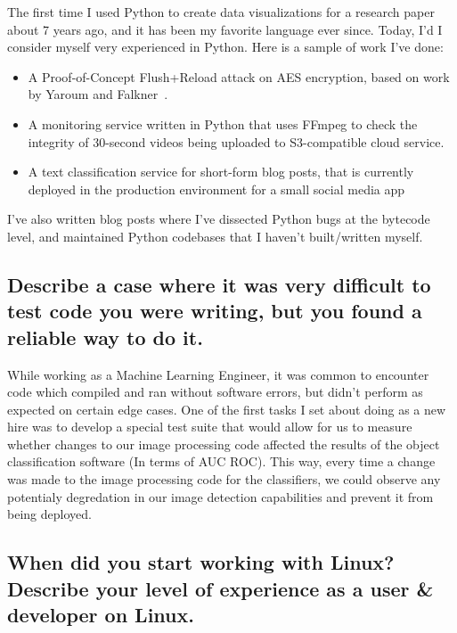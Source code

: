 \documentclass{article}
\begin{document}
The first time I used Python to create data visualizations for a research paper about 7 years
ago, and it has been my favorite language ever since. Today, I'd
I consider myself very experienced in Python. Here is a sample of work
I've done:

\begin{itemize}
  \item A Proof-of-Concept Flush+Reload attack on AES encryption, based on work
        by Yaroum and Falkner~\cite{flushreload}.
  \item A monitoring service written in Python that uses FFmpeg to check the
        integrity of 30-second videos being uploaded to S3-compatible cloud service.
  \item A text classification service for short-form blog posts, that is
        currently deployed in the production environment for a small social media app
\end{itemize}

I've also written blog posts where I've dissected Python bugs at the bytecode
level, and maintained Python codebases that I haven't built/written
myself.

\subsection{Describe a case where it was very difficult to test code you were
  writing, but you found a reliable way to do it.}

While working as a Machine Learning Engineer, it was common to encounter
code which compiled and ran without software errors, but didn't perform as
expected on certain edge cases. One of the first tasks I set about doing as a
new hire was to develop a special test suite that would allow for us to measure
whether changes to our image processing code affected the results of the object
classification software (In terms of AUC ROC\cite{auc_roc}). This way, every
time a change was made to the image processing code for the classifiers, we could
observe any potentialy degredation in our image detection capabilities and prevent
it from being deployed.

\subsection{When did you start working with Linux? Describe your level of
  experience as a user \& developer on Linux.}
\end{document}
